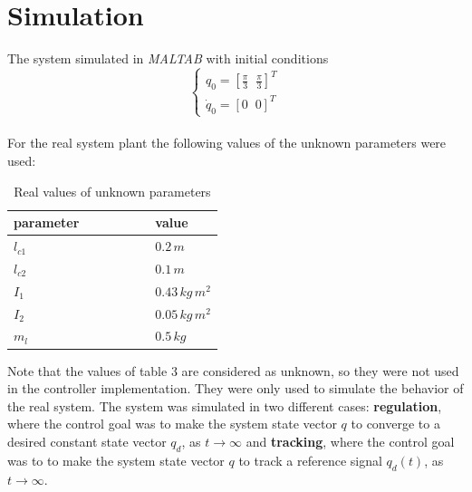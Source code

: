 \documentclass[a4paper]{article}
\begin{document}
\section{Simulation}
The system simulated in \textit{MALTAB} with initial conditions 
$$
    \begin{cases}
        q_0 = [\frac{\pi}{3} \;\; \frac{\pi}{3}]^T \\
        \dot{q}_0 = [0 \;\; 0]^T
    \end{cases}
$$
\\
For the real system plant the following values of the unknown parameters were used:
\begin{table}[H]
    \centering
    \begin{tabular}{lllllll}
        \hline
        \textbf{parameter} & & & & & & \textbf{value}              \\ \hline
        $l_{c1}$              & & & & & & $0.2 \, m$                        \\
        $l_{c2}$              & & & & & & $0.1 \, m$                        \\
        $I_1$              & & & & & & $0.43 \, kg \, m^2$                       \\
        $I_2$              & & & & & & $0.05 \, kg \, m^2$                       \\
        $m_l$                & & & & & & $0.5 \, kg$ \\ \hline
    \end{tabular}
    \caption{Real values of unknown parameters}
\end{table}

\noindent\hspace{-2pt}
Note that the values of table 3 are considered as unknown, so they were not used in the controller implementation.
They were only used to simulate the behavior of the real system. The system was simulated in two different cases: 
\textbf{regulation}, where the control goal was to make the system state vector $q$ to converge to a desired constant 
state vector $q_d$, as $t\rightarrow \infty$ and \textbf{tracking}, where the control goal was to to make the system state vector $q$ to 
track a reference signal $q_d(t)$, as $t \rightarrow \infty$.
\end{document}

